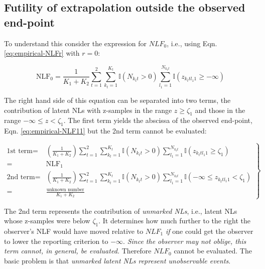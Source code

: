 \documentclass[
]{book}
\begin{document}
\hypertarget{empirical-froc-plot-futility-extrapolation}{%
\subsection{Futility of extrapolation outside the observed end-point}\label{empirical-froc-plot-futility-extrapolation}}

To understand this consider the expression for \(NLF_0\), i.e., using Eqn. \eqref{eq:empirical-NLFr} with \(r = 0\):

\begin{equation}
\text{NLF}_0 = \frac{1}{K_1+K_2} \sum_{t=1}^{2} \sum_{k_t=1}^{K_t} \mathbb{I} \left ( N_{k_t t} > 0 \right ) \sum_{l_1=1}^{N_{k_t t}} \mathbb{I} \left ( z_{k_t t l_1 1} \geq -\infty \right ) 
\end{equation}

The right hand side of this equation can be separated into two terms, the contribution of latent NLs with z-samples in the range \(z \geq \zeta_1\) and those in the range \(-\infty \leq z < \zeta_1\). The first term yields the abscissa of the observed end-point, Eqn. \eqref{eq:empirical-NLF11} but the 2nd term cannot be evaluated:

\begin{equation}
\left. 
\begin{aligned} 
\text{1st term}=&\left (\frac{1}{K_1+K_2} \right )\sum_{t=1}^{2} \sum_{k_t=1}^{K_t} \mathbb{I} \left ( N_{k_t t} > 0 \right ) \sum_{l_1=1}^{N_{k_t t}} \mathbb{I} \left ( z_{k_t t l_1 1} \ge \zeta_1 \right )\\
=&\text{NLF}_1\\
\text{2nd term}=&\left (\frac{1}{K_1+K_2} \right )\sum_{t=1}^{2} \sum_{k_t=1}^{K_t} \mathbb{I} \left ( N_{k_t t} > 0 \right ) \sum_{l_1=1}^{N_{k_t t}} \mathbb{I} \left ( -\infty \leq z_{k_t t l_1 1} < \zeta_1 \right )\\
=&\frac{\text{unknown number}}{K_1+K_2}
\end{aligned}
\right \} 
\label{eq:empirical-NLF0a}
\end{equation}

The 2nd term represents the contribution of \emph{unmarked NLs}, i.e., latent NLs whose z-samples were below \(\zeta_1\). It determines how much further to the right the observer's NLF would have moved relative to \(NLF_1\) \emph{if} one could get the observer to lower the reporting criterion to \(-\infty\). \emph{Since the observer may not oblige, this term cannot, in general, be evaluated.} Therefore \(NLF_0\) cannot be evaluated. The basic problem is that \emph{unmarked latent NLs represent unobservable events}.
\end{document}
